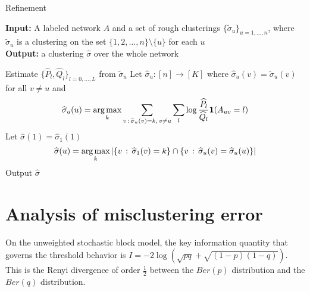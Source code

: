 \documentclass{article}
\begin{document}
\begin{algorithm}
\caption{Refinement}
\label{alg:refinement}
\textbf{Input:} A labeled network $A$ and a set of rough clusterings $\{\tilde{\sigma}_u\}_{u=1,...,n}$, where $\tilde \sigma_u$ is a clustering on the set $\{1, 2, \dots, n\} \setminus \{u\}$ for each $u$ \\
\textbf{Output:} a clustering $\hat{\sigma}$ over the whole network

\begin{algorithmic}[1]
   \State Estimate $\{ \hat{P}_l, \hat{Q}_l\}_{l=0,...,L}$ from $\tilde{\sigma}_u$
   \State Let $\hat{\sigma}_u : [n] \rightarrow [K]$ where 
       $\hat{\sigma}_u(v) = \tilde{\sigma}_u(v)$ for all $v \neq u$ and 
   \[
    \widehat{\sigma}_u(u) = \mathop{\text{\rm arg\,max}}_k \sum_{v \,:\, \widetilde{\sigma}_u(v) = k ,\, v\neq u} 
         \sum_l \log \frac{\widehat{P}_l}{\widehat{Q}_l} \mbox{\boldmath $1$}(A_{uv} = l) 
     \]    
\EndFor 
\State Let $\hat{\sigma}(1) = \hat{\sigma}_1(1)$  
\[
\widehat{\sigma}(u) = \mathop{\text{\rm arg\,max}}_k | \{ v \,:\,  \widehat{\sigma}_1(v) = k \} \cap
                                 \{ v \,:\, \widehat{\sigma}_u(v) = \widehat{\sigma}_u(u) \}|
\]
\EndFor
\State Output $\hat{\sigma}$
\end{algorithmic}

\end{algorithm}




\section{Analysis of misclustering error}
\label{sec:rate}

On the unweighted stochastic block model, the key information quantity that governs the threshold behavior is $I = -2 \log (\sqrt{p q} + \sqrt{(1-p)(1-q)})$. This is the Renyi divergence of order $\frac{1}{2}$ between the $Ber(p)$ distribution and the $Ber(q)$ distribution. 
\end{document}
